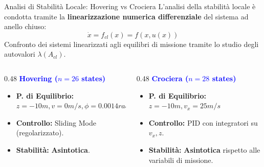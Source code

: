 \documentclass[aspectratio=169]{beamer} %
\begin{document}


\begin{frame}{Analisi di Stabilità Locale: Hovering vs Crociera}
    \small
    L'analisi della stabilità locale è condotta tramite la \textbf{linearizzazione numerica differenziale} del sistema ad anello chiuso:
    \begin{equation}
        \dot{x} = f_{cl}(x) = f(x, u(x))
    \end{equation}
    Confronto dei sistemi linearizzati agli equilibri di missione tramite lo studio degli autovalori $\lambda(A_{cl})$.

    \vspace{0.3cm}
    \begin{columns}[t]
        \begin{column}{0.48\textwidth}
            \centering
            \textbf{\textcolor{blue}{Hovering ($n=26$ states)}}
            \vspace{0.2cm}
            \begin{itemize}
                \item \textbf{P. di Equilibrio:} $z = -10m, v = 0m/s, \phi = 0.0014 rad$
                \item \textbf{Controllo:} Sliding Mode (regolarizzato).
                \item \textbf{Stabilità:} \textbf{Asintotica}.
            \end{itemize}
        \end{column}

        \vrule{} 

        \begin{column}{0.48\textwidth}
            \centering
            \textbf{\textcolor{blue}{Crociera ($n=28$ states)}}
            \vspace{0.2cm}
            \begin{itemize}
                \item \textbf{P. di Equilibrio:} $z = -10m, v_x = 25m/s$
                \item \textbf{Controllo:} PID con integratori su $v_x, z$.
                \item \textbf{Stabilità:} \textbf{Asintotica} rispetto alle variabili di missione.
            \end{itemize}
        \end{column}
    \end{columns}


\end{frame}
\end{document}
